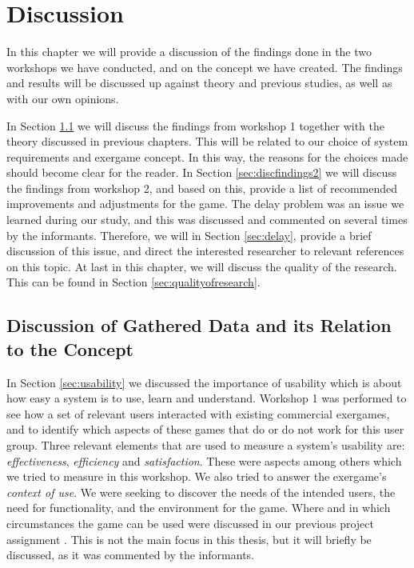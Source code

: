 \chapter{Discussion}
\label{chap:discussion}

In this chapter we will provide a discussion of the findings done in the two workshops we have conducted, and on the concept we have created. The findings and results will be discussed up against theory and previous studies, as well as with our own opinions. 

In Section \ref{sec:discfindings1} we will discuss the findings from workshop 1 together with the theory discussed in previous chapters. This will be related to our choice of system requirements and exergame concept.  In this way, the reasons for the choices made should become clear for the reader. In Section \ref{sec:discfindings2} we will discuss the findings from workshop 2, and based on this, provide a list of recommended improvements and adjustments for the game. The delay problem was an issue we learned during our study, and this was discussed and commented on several times by the informants. Therefore, we will in Section \ref{sec:delay}, provide a brief discussion of this issue, and direct the interested researcher to relevant references on this topic. At last in this chapter, we will discuss the quality of the research. This can be found in Section \ref{sec:qualityofresearch}. 

\section{Discussion of Gathered Data and its Relation to the Concept}
\label{sec:discfindings1}

In Section \ref{sec:usability} we discussed the importance of usability which is about how easy a system is to use, learn and understand. Workshop 1 was performed to see how a set of relevant users interacted with existing commercial exergames, and to identify which aspects of these games that do or do not work for this user group. Three relevant elements that are used to measure a system's usability are: \emph{effectiveness}, \emph{efficiency}  and \emph{satisfaction}. These were aspects among others which we tried to measure in this workshop. We also tried to answer the exergame's \emph{context of use}. We were seeking to discover the needs of the intended users, the need for functionality, and the environment for the game. Where and in which circumstances the game can be used were discussed in our previous project assignment \cite{project}. This is not the main focus in this thesis, but it will briefly be discussed, as it was commented by the informants.


